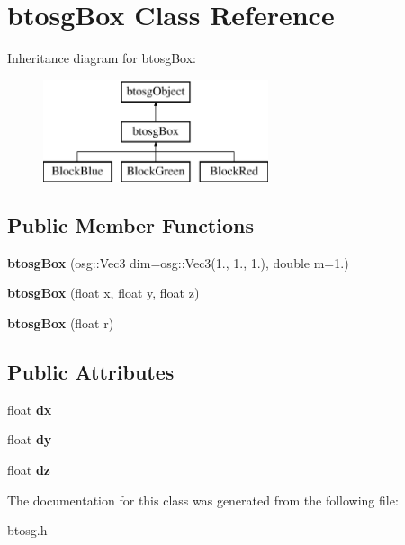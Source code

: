 \hypertarget{classbtosgBox}{}\section{btosg\+Box Class Reference}
\label{classbtosgBox}
Inheritance diagram for btosg\+Box\+:\begin{figure}[H]
\begin{center}
\leavevmode
\includegraphics[height=3.000000cm]{classbtosgBox}
\end{center}
\end{figure}
\subsection*{Public Member Functions}
\begin{DoxyCompactItemize}
\item 
\mbox{\label{classbtosgBox_a7b899d77d6ce1cd9fd1a506219814c2c}} 
{\bfseries btosg\+Box} (osg\+::\+Vec3 dim=osg\+::\+Vec3(1., 1., 1.), double m=1.)
\item 
\mbox{\label{classbtosgBox_a0b7809cf498d50ced7c6e4a1bf0f5470}} 
{\bfseries btosg\+Box} (float x, float y, float z)
\item 
\mbox{\label{classbtosgBox_a3b17e84e3f94aabdc7b8517bd802a5c9}} 
{\bfseries btosg\+Box} (float r)
\end{DoxyCompactItemize}
\subsection*{Public Attributes}
\begin{DoxyCompactItemize}
\item 
\mbox{\label{classbtosgBox_a1d1e4744d9e377e1462ea097dacef716}} 
float {\bfseries dx}
\item 
\mbox{\label{classbtosgBox_a7665337187adb52a1ce3b4cf2819217d}} 
float {\bfseries dy}
\item 
\mbox{\label{classbtosgBox_a1dd905f6afb684d5d364f2b211dbab97}} 
float {\bfseries dz}
\end{DoxyCompactItemize}


The documentation for this class was generated from the following file\+:\begin{DoxyCompactItemize}
\item 
btosg.\+h\end{DoxyCompactItemize}
